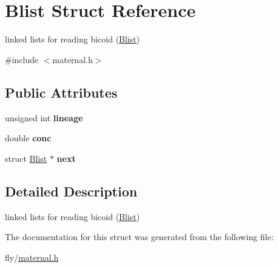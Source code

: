 \hypertarget{structBlist}{
\section{Blist Struct Reference}
\label{structBlist}
}


linked lists for reading bicoid (\hyperlink{structBlist}{Blist})  


{\ttfamily \#include $<$maternal.h$>$}\subsection*{Public Attributes}
\begin{DoxyCompactItemize}
\item 
\hypertarget{structBlist_a29a662d6c3ee7b3fc4aa26cd223b26a6}{
unsigned int {\bfseries lineage}}
\label{structBlist_a29a662d6c3ee7b3fc4aa26cd223b26a6}

\item 
\hypertarget{structBlist_a925f74235eb4884d845cfc05bb0fa172}{
double {\bfseries conc}}
\label{structBlist_a925f74235eb4884d845cfc05bb0fa172}

\item 
\hypertarget{structBlist_aabbda9d2c42188410d9cf9931bc449c8}{
struct \hyperlink{structBlist}{Blist} $\ast$ {\bfseries next}}
\label{structBlist_aabbda9d2c42188410d9cf9931bc449c8}

\end{DoxyCompactItemize}


\subsection{Detailed Description}
linked lists for reading bicoid (\hyperlink{structBlist}{Blist}) 

The documentation for this struct was generated from the following file:\begin{DoxyCompactItemize}
\item 
fly/\hyperlink{maternal_8h}{maternal.h}\end{DoxyCompactItemize}
